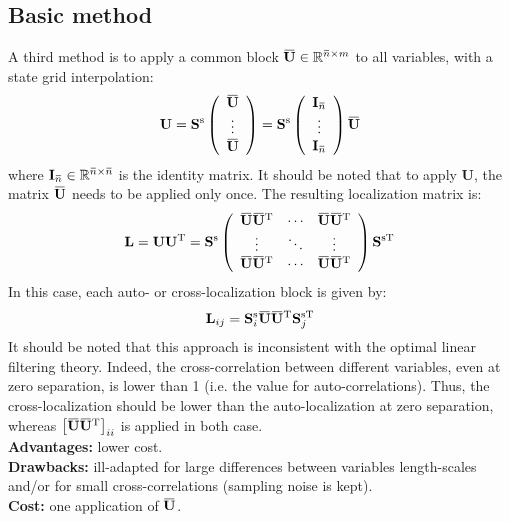 \documentclass[12pt]{scrartcl}
\newcommand{\overbar}[1]{\mkern 1.5mu\overline{\mkern-1.5mu#1\mkern-1.5mu}\mkern 1.5mu}
\begin{document}
\subsection{Basic method}
A third method is to apply a common block $\overbar{\mathbf{U}} \in \mathbb{R}^{\overbar{n} \times m}$ to all variables, with a state grid interpolation:
\begin{align}
\mathbf{U} = \mathbf{S}^\mathrm{s} \left( \begin{array}{c}
\overbar{\mathbf{U}} \\
\vdots \\
\overbar{\mathbf{U}}
\end{array} \right) = \mathbf{S}^\mathrm{s} \left( \begin{array}{c}
\mathbf{I}_{\overbar{n}} \\
\vdots \\
\mathbf{I}_{\overbar{n}} \\
\end{array} \right) \overbar{\mathbf{U}}
\end{align}
where $\mathbf{I}_{\overbar{n}} \in \mathbb{R}^{\overbar{n} \times \overbar{n}}$ is the identity matrix. It should be noted that to apply $\mathbf{U}$, the matrix $\overbar{\mathbf{U}}$ needs to be applied only once. The resulting localization matrix is:
\begin{align}
\mathbf{L} = \mathbf{U} \mathbf{U}^\mathrm{T} = \mathbf{S}^\mathrm{s} \left( \begin{array}{ccc}
\overbar{\mathbf{U}} \overbar{\mathbf{U}}^\mathrm{T} & \cdots & \overbar{\mathbf{U}} \overbar{\mathbf{U}}^\mathrm{T} \\
\vdots & \ddots & \vdots  \\
\overbar{\mathbf{U}} \overbar{\mathbf{U}}^\mathrm{T} & \cdots & \overbar{\mathbf{U}} \overbar{\mathbf{U}}^\mathrm{T}
\end{array} \right) \mathbf{S}^{\mathrm{s} \mathrm{T}}
\end{align}
In this case, each auto- or cross-localization block is given by: 
\begin{align}
\mathbf{L}_{ij} = \mathbf{S}^\mathrm{s}_i \overbar{\mathbf{U}} \overbar{\mathbf{U}}^\mathrm{T} \mathbf{S}_j^{\mathrm{s} \mathrm{T}}
\end{align}
It should be noted that this approach is inconsistent with the optimal linear filtering theory. Indeed, the cross-correlation between different variables, even at zero separation, is lower than 1 (i.e. the value for auto-correlations). Thus, the cross-localization should be lower than the auto-localization at zero separation, whereas $\left[\overbar{\mathbf{U}} \overbar{\mathbf{U}}^\mathrm{T}\right]_{ii}$ is applied in both case.\\
$  $\\
\textbf{Advantages:} lower cost.\\
\textbf{Drawbacks:} ill-adapted for large differences between variables length-scales and/or for small cross-correlations (sampling noise is kept).\\
\textbf{Cost:} one application of $\overbar{\mathbf{U}}$.
\end{document}
